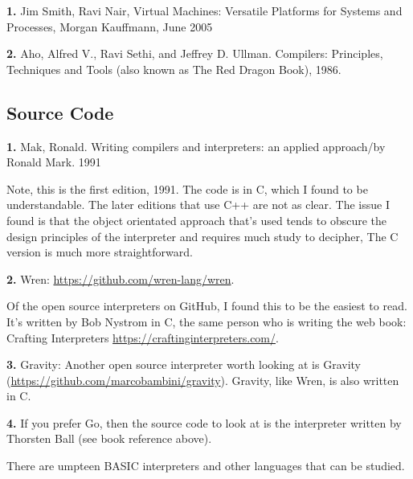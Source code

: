 {\bf 1.} Jim Smith, Ravi Nair, Virtual Machines: Versatile Platforms for Systems and Processes, Morgan Kauffmann, June 2005

{\bf 2.} Aho, Alfred V., Ravi Sethi, and Jeffrey D. Ullman. Compilers: Principles, Techniques and Tools (also known as The Red Dragon Book), 1986.

\subsection*{Source Code}

{\bf 1.} Mak, Ronald. Writing compilers and interpreters: an applied approach/by Ronald Mark. 1991

Note, this is the first edition, 1991. The code is in C, which I found to be understandable. The later editions that use C++ are not as clear. The issue I found is that the object orientated approach that's used tends to obscure the design principles of the interpreter and requires much study to decipher, The C version is much more straightforward.

{\bf 2.} Wren: \url{https://github.com/wren-lang/wren}.

Of the open source interpreters on GitHub, I found this to be the easiest to read. It's written by Bob Nystrom in C, the same person who is writing the web book: Crafting Interpreters \url{https://craftinginterpreters.com/}.

{\bf 3.} Gravity:  Another open source interpreter worth looking at is Gravity (\url{https://github.com/marcobambini/gravity}). Gravity, like Wren, is also written in C.

{\bf 4.}  If you prefer Go, then the source code to look at is the interpreter written by Thorsten Ball (see book reference above).

There are umpteen BASIC interpreters and other languages that can be studied.

\bigskip\medskip

\begin{center}
\end{center} 